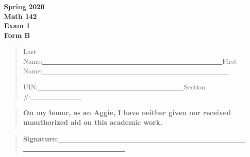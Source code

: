 \documentclass[11pt]{article}
\begin{document}
\Huge
\begin{center}
\textbf{
        Spring 2020 \\
        Math 142 \\
        Exam 1\\
        Form B
}
\end{center}
\Large
\vspace{.65truein}
\begin{quote}
Last Name:\underline{~~~~~~~~~~~~~~~~~~~~~~~~~~~~~~~~~~~~~~~~~~~~~~~~~~~~~}\hspace{.2truein}First
Name:\underline{~~~~~~~~~~~~~~~~~~~~~~~~~~~~~~~~~~~~~~~~~~~~~~~~~~~~~~~}

\vspace{.5truein}
UIN:\underline{~~~~~~~~~~~~~~~~~~~~~~~~~~~~~~~~~~~~~~~~~~~}\hspace{.2truein}Section \#:\underline{~~~~~~~~~~~~~~~}\hspace{.2truein}
\end{quote}

\vfill
\begin{quote}
{\bf \Large On my honor, as an Aggie, I have neither given nor received unauthorized aid on
this academic work.}
\end{quote}

\begin{quote}
{\bf \Large Signature:\underline{~~~~~~~~~~~~~~~~~~~~~~~~~~~~~~~~~~~~~~~~~~~~~~~~~~~~~~~~~~~~~~~~~~~~~~~~~~}}
\end{quote}
\end{document}
